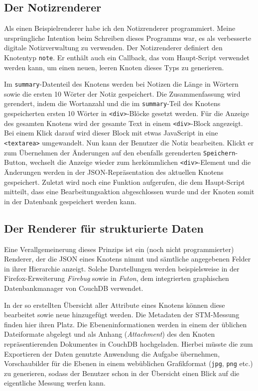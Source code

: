 \documentclass[12pt,ngerman,a4]{scrartcl}
\newcommand{\code}[1]{\texttt{#1}}
\begin{document}
\subsection{Der Notizrenderer}
Als einen Beispielrenderer habe ich den Notizrenderer programmiert. Meine ursprüngliche Intention beim Schreiben dieses Programms war, es als verbesserte digitale Notizverwaltung zu verwenden. Der Notizrenderer definiert den Knotentyp \code{note}. Er enthält auch ein Callback, das vom Haupt-Script verwendet werden kann, um einen neuen, leeren Knoten dieses Typs zu generieren.

Im \code{summary}-Datenteil des Knotens werden bei Notizen die Länge in Wörtern sowie die ersten 10 Wörter der Notiz gespeichert. Die Zusammenfassung wird gerendert, indem die Wortanzahl und die im \code{summary}-Teil des Knotens gespeicherten ersten 10 Wörter in \code{<div>}-Blöcke gesetzt werden. Für die Anzeige des gesamten Knotens wird der gesamte Text in einem \code{<div>}-Block angezeigt. Bei einem Klick darauf wird dieser Block mit etwas JavaScript in eine \code{<textarea>} umgewandelt. Nun kann der Benutzer die Notiz bearbeiten. Klickt er zum Übernehmen der Änderungen auf den ebenfalls gerenderten \code{Speichern}-Button, wechselt die Anzeige wieder zum herkömmlichen \code{<div>}-Element und die Änderungen werden in der JSON-Repräsentation des aktuellen Knotens gespeichert. Zuletzt wird noch eine Funktion aufgerufen, die dem Haupt-Script mitteilt, dass eine Bearbeitungsaktion abgeschlossen wurde und der Knoten somit in der Datenbank gespeichert werden kann.
\subsection{Der Renderer für strukturierte Daten}
Eine Verallgemeinerung dieses Prinzips ist ein (noch nicht programmierter) Renderer, der die JSON eines Knotens nimmt und sämtliche angegebenen Felder in ihrer Hierarchie anzeigt. Solche Darstellungen werden beispielsweise in der Firefox-Erweiterung \emph{Firebug}\cite{firebug} sowie in \emph{Futon}\cite{futon}, dem integrierten graphischen Datenbankmanager von CouchDB verwendet.

In der so erstellten Übersicht aller Attribute eines Knotens können diese bearbeitet sowie neue hinzugefügt werden. Die Metadaten der STM-Messung finden hier ihren Platz. Die Ebeneninformationen werden in einem der üblichen Dateiformate abgelegt und als Anhang (\emph{Attachment}) des den Knoten repräsentierenden Dokumentes in CouchDB hochgeladen. Hierbei müsste die zum Exportieren der Daten genutzte Anwendung die Aufgabe übernehmen, Vorschaubilder für die Ebenen in einem webüblichen Grafikformat (\code{jpg}, \code{png} etc.) zu generieren, sodass der Benutzer schon in der Übersicht einen Blick auf die eigentliche Messung werfen kann.
\end{document}
